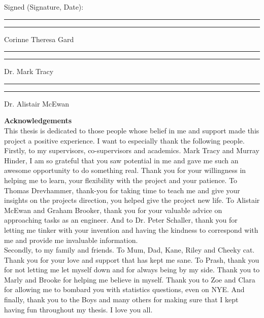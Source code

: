 \documentclass[12pt, openany, oneside]{book}
\begin{document}
\vspace{1cm}

Signed (Signature, Date):


\begin{center}
\vspace{1cm}
\rule[0.5em]{18em}{0.5pt}
\hfill
\rule[0.5em]{18em}{0.5pt}
Corinne Theresa Gard
\end{center}

\begin{center}
\vspace{1cm}
\rule[0.5em]{18em}{0.5pt}
\hfill
\rule[0.5em]{18em}{0.5pt}
Dr. Mark Tracy
\end{center}


\begin{center}
\vspace{1cm}
\rule[0.5em]{18em}{0.5pt}
\hfill
\rule[0.5em]{18em}{0.5pt}
Dr. Alistair McEwan
\end{center}





\clearpage
{\Large \bfseries Acknowledgements}\\

This thesis is dedicated to those people whose belief in me and support made this project a positive experience. I want to especially thank the following people.\\

Firstly, to my supervisors, co-supervisors and academics. Mark Tracy and Murray Hinder, I am so grateful that you saw potential in me and gave me such an awesome opportunity to do something real. Thank you for your willingness in helping me to learn, your flexibility with the project and your patience. To Thomas Drevhammer, thank-you for taking time to teach me and give your insights on the projects direction, you helped give the project new life. To Alistair McEwan and Graham Brooker, thank you for your valuable advice on approaching tasks as an engineer. And to Dr. Peter Schaller, thank you for letting me tinker with your invention and having the kindness to correspond with me and provide me invaluable information. \\

Secondly, to my family and friends. To Mum, Dad, Kane, Riley and Cheeky cat. Thank you for your love and support that has kept me sane. To Prash, thank you for not letting me let myself down and for always being by my side. Thank you to Marly and Brooke for helping me believe in myself. Thank you to Zoe and Clara for allowing me to bombard you with statistics questions, even on NYE. And finally, thank you to the Boys and many others for making sure that I kept having fun throughout my thesis. I love you all.\\
\end{document}
